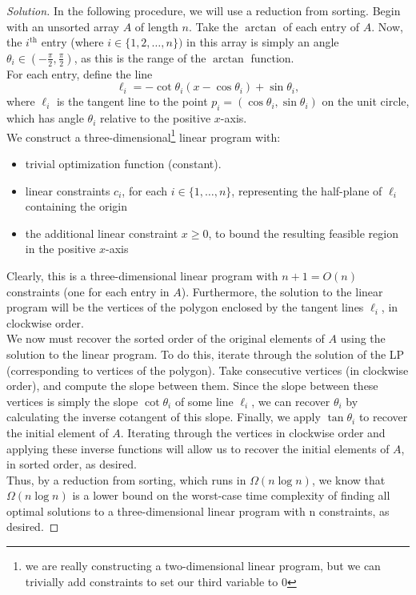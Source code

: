 \documentclass[11pt]{article}
\newenvironment{solution}
  {\renewcommand\qedsymbol{$\blacksquare$}\begin{proof}[Solution]}
  {\end{proof}}
\begin{document}
\begin{enumerate}
    \begin{solution}
    In the following procedure, we will use a reduction from sorting. Begin with an unsorted array $A$ of length $n$. Take the $\arctan$ of each entry of $A$. Now, the $i^{\text{th}}$ entry (where $i \in \{1, 2, \dots, n\})$ in this array is simply an angle $\theta_i \in (-\frac{\pi}{2}, \frac{\pi}{2})$, as this is the range of the $\arctan$ function. \\

    For each entry, define the line \[\ell_i = -\cot \theta_i (x - \cos \theta_i) + \sin \theta_i,\] where $\ell_i$ is the tangent line to the point $p_i = (\cos \theta_i, \sin \theta_i)$ on the unit circle, which has angle $\theta_i$ relative to the positive $x$-axis. \\

    We construct a three-dimensional\footnote{we are really constructing a two-dimensional linear program, but we can trivially add constraints to set our third variable to $0$} linear program with:
    \begin{itemize}
        \item trivial optimization function (constant).
        \item linear constraints $c_i$, for each $i \in \{1, \dots, n\}$, representing the half-plane of $\ell_i$ containing the origin
        \item the additional linear constraint $x \geq 0$, to bound the resulting feasible region in the positive $x$-axis
    \end{itemize}

    Clearly, this is a three-dimensional linear program with $n + 1 = O(n)$ constraints (one for each entry in $A$). Furthermore, the solution to the linear program will be the vertices of the polygon enclosed by the tangent lines $\ell_i$, in clockwise order. \\

    We now must recover the sorted order of the original elements of $A$ using the solution to the linear program. To do this, iterate through the solution of the LP (corresponding to vertices of the polygon). Take consecutive vertices (in clockwise order), and compute the slope between them. Since the slope between these vertices is simply the slope $\cot \theta_i$ of some line $\ell_i$, we can recover $\theta_i$ by calculating the inverse cotangent of this slope. Finally, we apply $\tan \theta_i$ to recover the initial element of $A$. Iterating through the vertices in clockwise order and applying these inverse functions will allow us to recover the initial elements of $A$, in sorted order, as desired. \\

    Thus, by a reduction from sorting, which runs in $\Omega(n \log n)$, we know that $\Omega(n \log n)$  is a lower bound on the worst-case time complexity of finding all optimal solutions to a three-dimensional linear program with n constraints, as desired.
    \end{solution}

\end{enumerate}
\end{document}
